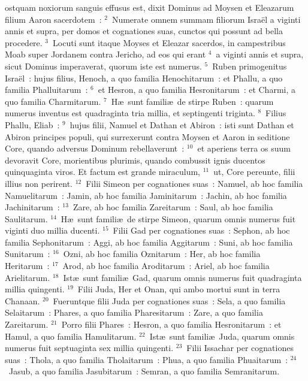 \bchapter
{}ostquam noxiorum sanguis effusus est, dixit Dominus ad Moysen et Eleazarum filium Aaron sacerdotem~:
${}^{2}$~Numerate omnem summam filiorum Isra\"el a viginti annis et supra, per domos et cognationes suas, cunctos qui possunt ad bella procedere.
${}^{3}$~Locuti sunt itaque Moyses et Eleazar sacerdos, in campestribus Moab super Jordanem contra Jericho, ad eos qui erant
${}^{4}$~a viginti annis et supra, sicut Dominus imperaverat, quorum iste est numerus.
${}^{5}$~Ruben primogenitus Isra\"el~: hujus filius, Henoch, a quo familia Henochitarum~: et Phallu, a quo familia Phalluitarum~:
${}^{6}$~et Hesron, a quo familia Hesronitarum~: et Charmi, a quo familia Charmitarum.
${}^{7}$~H\ae\ sunt famili\ae\ de stirpe Ruben~: quarum numerus inventus est quadraginta tria millia, et septingenti triginta.
${}^{8}$~Filius Phallu, Eliab~:
${}^{9}$~hujus filii, Namuel et Dathan et Abiron~: isti sunt Dathan et Abiron principes populi, qui surrexerunt contra Moysen et Aaron in seditione Core, quando adversus Dominum rebellaverunt~:
${}^{10}$~et aperiens terra os suum devoravit Core, morientibus plurimis, quando combussit ignis ducentos quinquaginta viros. Et factum est grande miraculum,
${}^{11}$~ut, Core pereunte, filii illius non perirent.
${}^{12}$~Filii Simeon per cognationes suas~: Namuel, ab hoc familia Namuelitarum~: Jamin, ab hoc familia Jaminitarum~: Jachin, ab hoc familia Jachinitarum~:
${}^{13}$~Zare, ab hoc familia Zareitarum~: Saul, ab hoc familia Saulitarum.
${}^{14}$~H\ae\ sunt famili\ae\ de stirpe Simeon, quarum omnis numerus fuit viginti duo millia ducenti.
${}^{15}$~Filii Gad per cognationes suas~: Sephon, ab hoc familia Sephonitarum~: Aggi, ab hoc familia Aggitarum~: Suni, ab hoc familia Sunitarum~:
${}^{16}$~Ozni, ab hoc familia Oznitarum~: Her, ab hoc familia Heritarum~:
${}^{17}$~Arod, ab hoc familia Aroditarum~: Ariel, ab hoc familia Arielitarum.
${}^{18}$~Ist\ae\ sunt famili\ae\ Gad, quarum omnis numerus fuit quadraginta millia quingenti.
${}^{19}$~Filii Juda, Her et Onan, qui ambo mortui sunt in terra Chanaan.
${}^{20}$~Fueruntque filii Juda per cognationes suas~: Sela, a quo familia Selaitarum~: Phares, a quo familia Pharesitarum~: Zare, a quo familia Zareitarum.
${}^{21}$~Porro filii Phares~: Hesron, a quo familia Hesronitarum~: et Hamul, a quo familia Hamulitarum.
${}^{22}$~Ist\ae\ sunt famili\ae\ Juda, quarum omnis numerus fuit septuaginta sex millia quingenti.
${}^{23}$~Filii Issachar per cognationes suas~: Thola, a quo familia Tholaitarum~: Phua, a quo familia Phuaitarum~:
${}^{24}$~Jasub, a quo familia Jasubitarum~: Semran, a quo familia Semranitarum.
